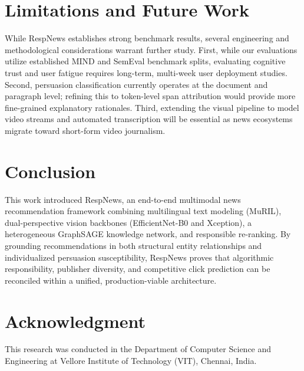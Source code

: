 \documentclass[conference]{IEEEtran}
\begin{document}
\section{Limitations and Future Work}
While RespNews establishes strong benchmark results, several engineering and methodological considerations warrant further study. First, while our evaluations utilize established MIND and SemEval benchmark splits, evaluating cognitive trust and user fatigue requires long-term, multi-week user deployment studies. Second, persuasion classification currently operates at the document and paragraph level; refining this to token-level span attribution would provide more fine-grained explanatory rationales. Third, extending the visual pipeline to model video streams and automated transcription will be essential as news ecosystems migrate toward short-form video journalism.

\section{Conclusion}
This work introduced RespNews, an end-to-end multimodal news recommendation framework combining multilingual text modeling (MuRIL), dual-perspective vision backbones (EfficientNet-B0 and Xception), a heterogeneous GraphSAGE knowledge network, and responsible re-ranking. By grounding recommendations in both structural entity relationships and individualized persuasion susceptibility, RespNews proves that algorithmic responsibility, publisher diversity, and competitive click prediction can be reconciled within a unified, production-viable architecture.

\section*{Acknowledgment}
This research was conducted in the Department of Computer Science and Engineering at Vellore Institute of Technology (VIT), Chennai, India.
\end{document}
